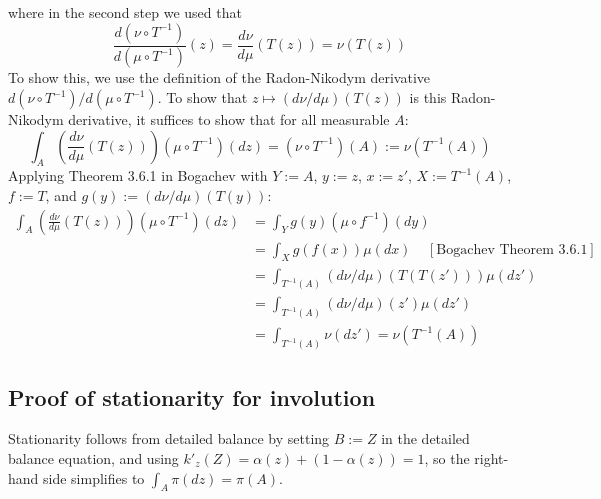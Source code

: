 \documentclass[twoside]{article}
\begin{document}
where in the second step we used that
\begin{equation}
\frac{d (\nu \circ T^{-1})}{d (\mu \circ T^{-1})}(z) = \frac{d \nu}{d \mu}(T(z)) = \nu(T(z))
\end{equation}
To show this, we use the definition of the Radon-Nikodym derivative $d (\nu \circ T^{-1}) / d (\mu \circ T^{-1})$.
To show that $z \mapsto (d \nu / d \mu)(T(z))$ is this Radon-Nikodym derivative, it suffices to show that for all measurable $A$:
\begin{equation}
\int_A \left( \frac{d \nu}{d \mu} (T(z)) \right) ( \mu \circ T^{-1} )(dz) = (\nu \circ T^{-1})(A) := \nu(T^{-1}(A))
\end{equation}
Applying Theorem 3.6.1 in Bogachev with $Y := A$, $y := z$, $x := z'$, $X := T^{-1}(A)$, $f := T$, and $g(y) := (d\nu / d\mu)(T(y))$:
\begin{align}
\int_A \left( \frac{d \nu}{d \mu} (T(z)) \right) ( \mu \circ T^{-1} )(dz)
&= \int_Y g(y) ( \mu \circ f^{-1} )(dy)\\
&= \int_X g(f(x)) \mu(dx) \;\;\;\; [\mbox{Bogachev Theorem 3.6.1}]\\
&= \int_{T^{-1}(A)} (d\nu / d\mu)(T(T(z'))) \mu(dz')\\
&= \int_{T^{-1}(A)} (d\nu / d\mu)(z') \mu(dz')\\
&= \int_{T^{-1}(A)} \nu(dz')
= \nu(T^{-1}(A))
\end{align}

\subsection{Proof of stationarity for involution}
Stationarity follows from detailed balance by setting $B := Z$ in the detailed balance equation, and using $k'_z(Z) = \alpha(z) + (1 - \alpha(z)) =1$, so the right-hand side simplifies to $\int_A \pi(dz) = \pi(A)$.
\end{document}
